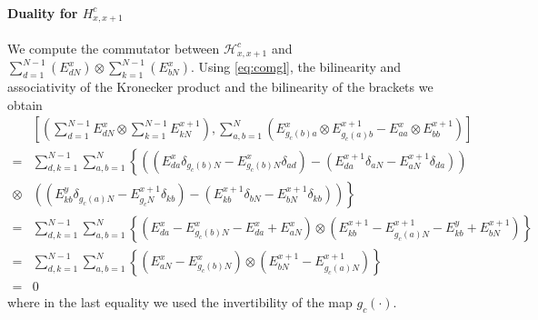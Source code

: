\documentclass[10pt]{article}
\numberwithin{equation}{section}
\numberwithin{equation}{subsection}
\begin{document}
\paragraph{Duality for $H_{x,x+1}^{c}$} We compute the commutator between $\mathcal{H}_{x,x+1}^{c}$ and $\sum_{d=1}^{N-1}(E_{dN}^{x})\otimes \sum_{k=1}^{N-1}(E_{bN}^{x})$. Using \eqref{eq:comgl}, the bilinearity and associativity of the Kronecker product and the bilinearity of the brackets we obtain 
\begin{align*}
	&\left[\left(\sum_{d=1}^{N-1}E_{dN}^{x}\otimes\sum_{k=1}^{N-1}E_{kN}^{x+1}\right), \sum_{a,b=1}^{N}\left(E_{g_{c}(b)a}^{x}\otimes E_{g_{c}(a)b}^{x+1} -E_{aa}^{x}\otimes E_{bb}^{x+1}\right)\right]
	\\=&
	\sum_{d,k=1}^{N-1}\sum_{a,b=1}^{N}\left\{\left((E_{da}^{x}\delta_{g_{c}(b)N}-E_{g_{c}(b)N}^{x}\delta_{ad})-(E_{da}^{x+1}\delta_{aN}-E_{aN}^{x+1}\delta_{da})\right)\right. \\ \otimes&\left. \left((E_{kb}^{y}\delta_{g_{c}(a)N}-E_{g_{c}N}^{x+1}\delta_{kb})-(E_{kb}^{x+1}\delta_{bN}-E_{bN}^{x+1}\delta_{kb})\right)\right\}
	\\=&
	\sum_{d,k=1}^{N-1}\sum_{a,b=1}^{N}\left\{\left(E_{da}^{x}-E_{g_{c}(b)N}^{x}-E_{da}^{x}+E_{aN}^{x}\right)\otimes\left(E_{kb}^{x+1}-E_{g_{c}(a)N}^{x+1}-E_{kb}^{y}+E_{bN}^{x+1}\right)\right\}
	\\=&
	\sum_{d,k=1}^{N-1}\sum_{a,b=1}^{N}\left\{\left(E_{aN}^{x}-E_{g_{c}(b)N}^{x}\right)\otimes \left(E_{bN}^{x+1}-E_{g_{c}(a)N}^{x+1}\right)\right\}
	\\=&0
\end{align*}
where in the last equality we used the invertibility of the map $g_{c}(\cdot)$. \\
\end{document}
